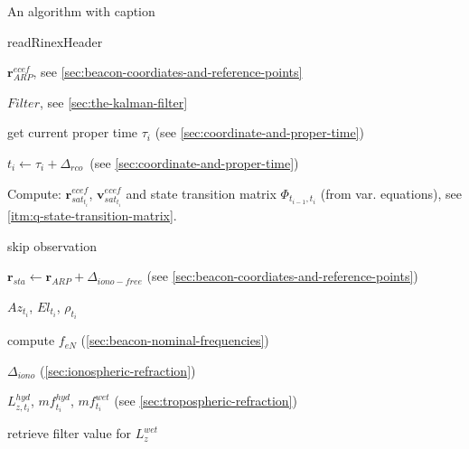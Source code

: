 \SetAlFnt{\footnotesize}

\begin{algorithm}
\caption{An algorithm with caption}\label{alg:two}

\BlankLine
readRinexHeader

 {
  $\bm{r}_{ARP}^{ecef}$, see \ref{sec:beacon-coordiates-and-reference-points}
}

$Filter$, see \ref{sec:the-kalman-filter}


{
  get current proper time $\tau_i$ (see \ref{sec:coordinate-and-proper-time})

  $t_i \gets \tau_i + \Delta_{rco}$\  (see \ref{sec:coordinate-and-proper-time})

  Compute: $\bm{r}_{sat_{t_i}}^{ecef}$, $\bm{v}_{sat_{t_i}}^{ecef}$ and 
  state transition matrix $\Phi _{t_{i-1},t_i}$ (from var. equations), see 
  \ref{itm:q-state-transition-matrix}.

  {
    {
      skip observation
    }
    {
      $\bm{r}_{sta} \gets \bm{r}_{ARP} + \Delta _{iono-free}$ 
      (see \ref{sec:beacon-coordiates-and-reference-points})

      $Az_{t_i}$, $El_{t_i}$, $\rho _{t_i}$

      {
        compute $f_{eN}$ (\ref{sec:beacon-nominal-frequencies})

        $\Delta_{iono}$ (\ref{sec:ionospheric-refraction})

        $L_{z,t_i}^{hyd}$, $mf_{t_i}^{hyd}$, $mf_{t_i}^{wet}$ (see \ref{sec:tropospheric-refraction})

        {
          retrieve filter value for $L_{z}^{wet}$
        }

}}}}
\end{algorithm}
